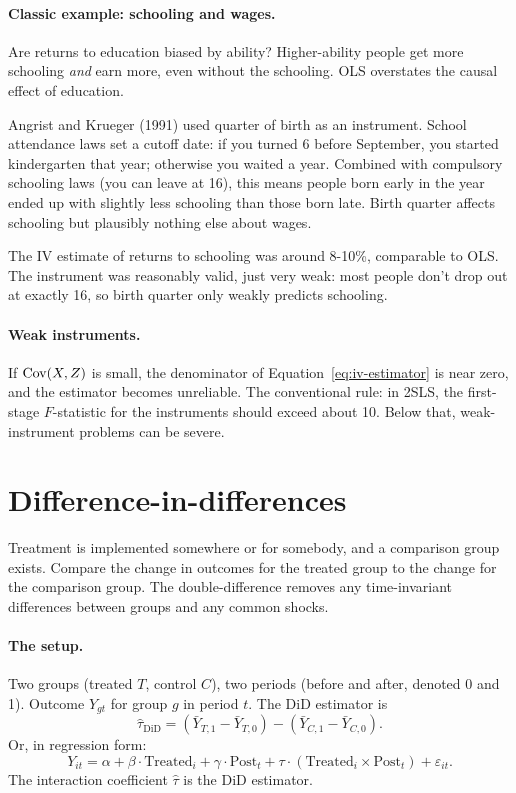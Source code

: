 \paragraph{Classic example: schooling and wages.} Are returns to education biased by ability? Higher-ability people get more schooling \emph{and} earn more, even without the schooling. OLS overstates the causal effect of education.

Angrist and Krueger (1991) used quarter of birth as an instrument. School attendance laws set a cutoff date: if you turned 6 before September, you started kindergarten that year; otherwise you waited a year. Combined with compulsory schooling laws (you can leave at 16), this means people born early in the year ended up with slightly less schooling than those born late. Birth quarter affects schooling but plausibly nothing else about wages.

The IV estimate of returns to schooling was around 8-10\%, comparable to OLS. The instrument was reasonably valid, just very weak: most people don't drop out at exactly 16, so birth quarter only weakly predicts schooling.

\paragraph{Weak instruments.} If $\operatorname{Cov}(X, Z)$ is small, the denominator of Equation~\ref{eq:iv-estimator} is near zero, and the estimator becomes unreliable. The conventional rule: in 2SLS, the first-stage $F$-statistic for the instruments should exceed about 10. Below that, weak-instrument problems can be severe.

\section{Difference-in-differences}

Treatment is implemented somewhere or for somebody, and a comparison group exists. Compare the change in outcomes for the treated group to the change for the comparison group. The double-difference removes any time-invariant differences between groups and any common shocks.

\paragraph{The setup.} Two groups (treated $T$, control $C$), two periods (before and after, denoted 0 and 1). Outcome $Y_{gt}$ for group $g$ in period $t$. The DiD estimator is
\begin{equation}
  \hat{\tau}_{\text{DiD}} = (\bar Y_{T,1} - \bar Y_{T,0}) - (\bar Y_{C,1} - \bar Y_{C,0}).
  \label{eq:did}
\end{equation}
Or, in regression form:
\[
  Y_{it} = \alpha + \beta \cdot \text{Treated}_i + \gamma \cdot \text{Post}_t + \tau \cdot (\text{Treated}_i \times \text{Post}_t) + \varepsilon_{it}.
\]
The interaction coefficient $\hat\tau$ is the DiD estimator.

